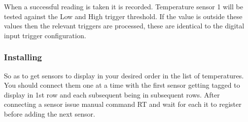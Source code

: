 	When a successful reading is taken it is recorded. Temperature sensor 1 will be tested 
	against the Low and High trigger threshold. If the value is outside these values then 
	the relevant triggers are processed, these are identical to the digital input trigger configuration.






	\subsubsection{Installing}
	So as to get sensors to display in your desired order in the list of temperatures. You should connect them one at a time
	with the first sensor getting tagged to display in 1st row and each subsequent being in subsequent rows.
	After connecting a sensor issue manual command RT and wait for each it to register before adding the next sensor.
